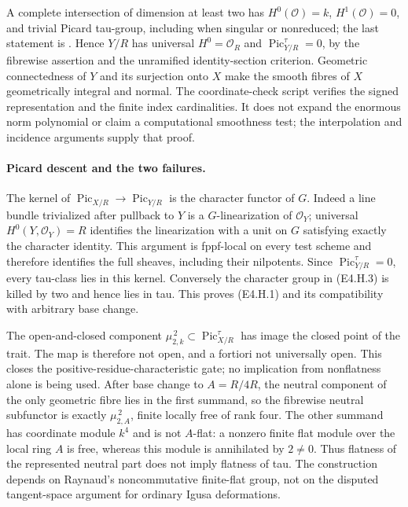 A complete intersection of dimension at least two has
$H^0(\mathcal O)=k$, $H^1(\mathcal O)=0$, and trivial Picard tau-group,
including when singular or nonreduced; the last statement is
\cite[Theorem~1.1.8(iii), proved in \S3.4]{BCECotnerZavyalov2024}.
Hence $Y/R$ has universal $H^0=\mathcal O_R$ and
$\operatorname{Pic}^\tau_{Y/R}=0$, by the fibrewise assertion and the
unramified identity-section criterion. Geometric connectedness of $Y$
and its surjection onto $X$ make the smooth fibres of $X$ geometrically
integral and normal. The coordinate-check script verifies the signed
representation and the finite index cardinalities. It does not expand
the enormous norm polynomial or claim a computational smoothness test;
the interpolation and incidence arguments supply that proof.

\paragraph{Picard descent and the two failures.}
The kernel of
$\operatorname{Pic}_{X/R}\to\operatorname{Pic}_{Y/R}$ is the character
functor of $G$. Indeed a line bundle trivialized after pullback to $Y$ is a
$G$-linearization of $\mathcal O_Y$; universal $H^0(Y,\mathcal O_Y)=R$
identifies the linearization with a unit on $G$ satisfying exactly the
character identity. This argument is fppf-local on every test scheme and
therefore identifies the full sheaves, including their nilpotents.
Since $\operatorname{Pic}^\tau_{Y/R}=0$, every tau-class lies in this
kernel. Conversely the character group in (E4.H.3) is killed by two and
hence lies in tau. This proves (E4.H.1) and its compatibility with arbitrary
base change.

The open-and-closed component
$\mu_{2,k}^{\,2}\subset\operatorname{Pic}^\tau_{X/R}$ has image the closed
point of the trait. The map is therefore not open, and a fortiori not
universally open. This closes the positive-residue-characteristic gate;
no implication from nonflatness alone is being used.
After base change to $A=R/4R$, the neutral component of the only geometric
fibre lies in the first summand, so the fibrewise neutral subfunctor is
exactly $\mu_{2,A}^{\,2}$, finite locally free of rank four. The other
summand has coordinate module $k^4$ and is not $A$-flat: a nonzero finite flat module over the
local ring $A$ is free, whereas this module is annihilated by $2\ne0$. Thus flatness of the represented
neutral part does not imply flatness of tau. The construction depends on
Raynaud's noncommutative finite-flat group, not on the disputed tangent-space
argument for ordinary Igusa deformations.

